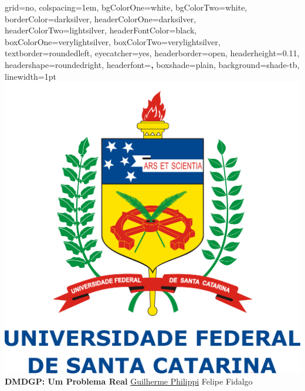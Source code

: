 \documentclass[portrait,final]{baposter}
\begin{document}
	
	\newlength{\leftimgwidth}
	\begin{poster}%
		{
			grid=no,
			colspacing=1em,
			bgColorOne=white,
			bgColorTwo=white,
			borderColor=darksilver,
			headerColorOne=darksilver,
			headerColorTwo=lightsilver,
			headerFontColor=black,
			boxColorOne=verylightsilver,
			boxColorTwo=verylightsilver,
			textborder=roundedleft,
			eyecatcher=yes,
			headerborder=open,
			headerheight=0.11\textheight,
			headershape=roundedright,
			headerfont=\large \textbf, %
			boxshade=plain,
			background=shade-tb,
			linewidth=1pt
		}
		{\includegraphics[scale=0.047]{logo_ufsc.png}}%
		{\sf\bf \LARGE DMDGP: Um Problema Real  \vspace*{0.5em}}
		{\sf \large \underline{Guilherme Philippi} \hspace{0.5em}  \hspace{0.5em} Felipe Fidalgo \\  \vspace*{0.5em}
}
\end{poster}
\end{document}

